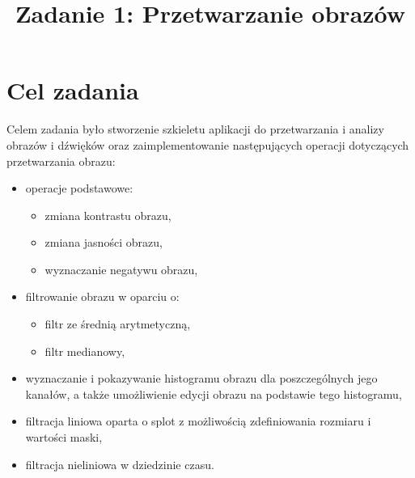 \documentclass{classrep}
\author{%
  \studentinfo{Michał Janiszewski}{169485} \and
  \studentinfo{Michał Kawski}{xxxxxx}
}
\title{Zadanie 1: Przetwarzanie obrazów}
\begin{document}
\maketitle

\section{Cel zadania}
Celem zadania było stworzenie szkieletu aplikacji do przetwarzania i analizy obrazów i dźwięków oraz zaimplementowanie następujących operacji dotyczących przetwarzania obrazu:
\begin{itemize}
 \item operacje podstawowe:
  \begin{itemize}
   \item zmiana kontrastu obrazu,
   \item zmiana jasności obrazu,
   \item wyznaczanie negatywu obrazu,
  \end{itemize}
 \item filtrowanie obrazu w oparciu o:
  \begin{itemize}
   \item filtr ze średnią arytmetyczną,
   \item filtr medianowy,
  \end{itemize}
 \item wyznaczanie i pokazywanie histogramu obrazu dla poszczególnych jego kanałów, a także umożliwienie edycji obrazu na podstawie tego histogramu,
 \item filtracja liniowa oparta o splot z możliwością zdefiniowania rozmiaru i wartości maski,
 \item filtracja nieliniowa w dziedzinie czasu.
\end{itemize}
\end{document}

